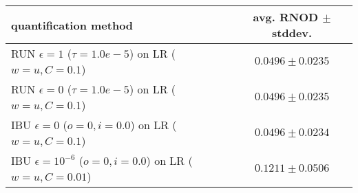 \begin{tabular}{lc}
  \toprule
  quantification method & avg. RNOD $\pm$ stddev. \\
  \midrule
  RUN $\epsilon=1$ ($\tau=1.0e-5$) on LR ($w=u, C=0.1$) & $\mathbf{0.0496 \pm 0.0235}$ \\
  RUN $\epsilon=0$ ($\tau=1.0e-5$) on LR ($w=u, C=0.1$) & $0.0496 \pm 0.0235$ \\
  IBU $\epsilon=0$ ($o=0, i=0.0$) on LR ($w=u, C=0.1$) & $0.0496 \pm 0.0234$ \\
  IBU $\epsilon=10^{-6}$ ($o=0, i=0.0$) on LR ($w=u, C=0.01$) & $0.1211 \pm 0.0506$ \\
  \bottomrule
\end{tabular}
